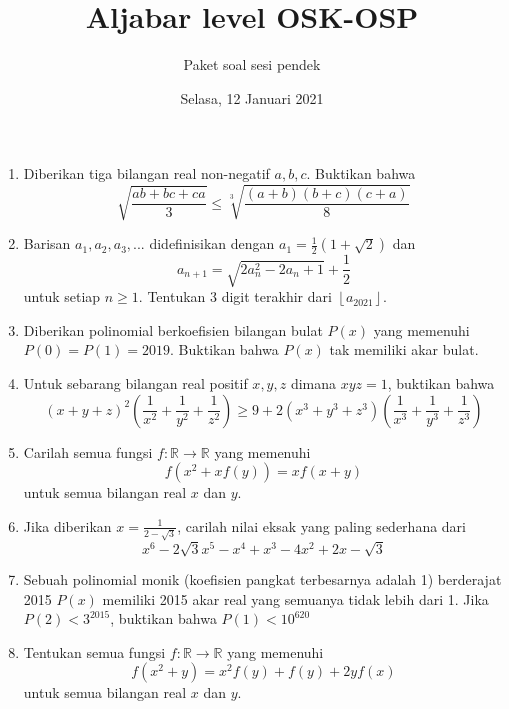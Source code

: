 \documentclass{article}
\title{Aljabar level OSK-OSP}
\author{Paket soal sesi pendek}
\date{Selasa, 12 Januari 2021}
\begin{document}
	\maketitle
	\begin{enumerate}
		\item
		
		Diberikan tiga bilangan real non-negatif $a,b,c$. Buktikan bahwa
		$$\sqrt{\dfrac{ab+bc+ca}{3}} \le \sqrt[3]{\dfrac{(a+b)(b+c)(c+a)}{8}}$$
		
		\item
		Barisan $a_1,a_2,a_3,...$ didefinisikan dengan $a_1=\frac12 (1+\sqrt{2})$ dan $$a_{n+1}=\sqrt{2a_n^2-2a_n+1}+\frac12$$ untuk setiap $n \ge 1$. Tentukan 3 digit terakhir dari $\left \lfloor{a_{2021}}\right \rfloor$.
		
		\item
		Diberikan polinomial berkoefisien bilangan bulat $P(x)$ yang memenuhi $P(0)=P(1)=2019$. Buktikan bahwa $P(x)$ tak memiliki akar bulat.
		
		\item
		Untuk sebarang bilangan real positif $x,y,z$ dimana $xyz=1$, buktikan bahwa $$(x+y+z)^2\left (\dfrac{1}{x^2}+\dfrac{1}{y^2}+\dfrac{1}{z^2}\right) \ge 9 + 2(x^3+y^3+z^3)\left (\dfrac{1}{x^3}+\dfrac{1}{y^3}+\dfrac{1}{z^3}\right) $$
		
		\item
		Carilah semua fungsi $f:\mathbb{R} \rightarrow \mathbb{R}$ yang memenuhi $$f(x^2+xf(y))=xf(x+y)$$ untuk semua bilangan real $x$ dan $y$.
		
		\item
		Jika diberikan $x=\frac{1}{2-\sqrt3}$, carilah nilai eksak yang paling sederhana dari $$x^6-2\sqrt3x^5-x^4+x^3-4x^2+2x-\sqrt3$$
		
		\item
		Sebuah polinomial monik (koefisien pangkat terbesarnya adalah 1) berderajat 2015 $P(x)$ memiliki 2015 akar real yang semuanya tidak lebih dari 1. Jika $P(2)<3^{2015}$, buktikan bahwa $P(1)<10^{620}$
		
		\item
		Tentukan semua fungsi $f:\mathbb{R} \rightarrow \mathbb{R}$ yang memenuhi $$f(x^2+y)=x^2f(y)+f(y)+2yf(x)$$ untuk semua bilangan real $x$ dan $y$.
		 
	\end{enumerate}
\end{document}
